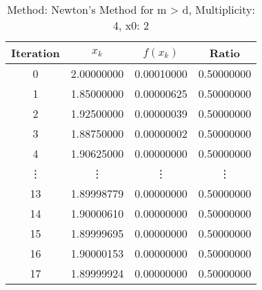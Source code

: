 \begin{table}
\centering
\caption{Method: Newton's Method for m > d, Multiplicity: 4, x0: 2}
\label{tab:table_Newton's_Method_for_m_>_d_4_2}
\begin{tabular}{c c c c}
\toprule
Iteration &      $x_k$ &   $f(x_k)$ &      Ratio \\
\midrule
        0 & 2.00000000 & 0.00010000 & 0.50000000 \\
        1 & 1.85000000 & 0.00000625 & 0.50000000 \\
        2 & 1.92500000 & 0.00000039 & 0.50000000 \\
        3 & 1.88750000 & 0.00000002 & 0.50000000 \\
        4 & 1.90625000 & 0.00000000 & 0.50000000 \\
   \vdots &     \vdots &     \vdots &     \vdots \\
       13 & 1.89998779 & 0.00000000 & 0.50000000 \\
       14 & 1.90000610 & 0.00000000 & 0.50000000 \\
       15 & 1.89999695 & 0.00000000 & 0.50000000 \\
       16 & 1.90000153 & 0.00000000 & 0.50000000 \\
       17 & 1.89999924 & 0.00000000 & 0.50000000 \\
\bottomrule
\end{tabular}
\end{table}
